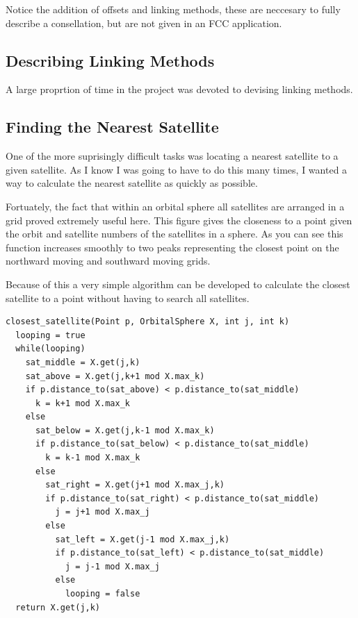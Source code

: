 \documentclass[12pt]{article}
\begin{document}
Notice the addition of offsets and linking methods, these are neccesary to fully describe a consellation, but are not given in an FCC application.

\subsection{Describing Linking Methods}

A large proprtion of time in the project was devoted to devising linking methods.


\subsection{Finding the Nearest Satellite}

One of the more suprisingly difficult tasks was locating a nearest satellite to a given satellite. As I know I was going to have to do this many times, I wanted a way to calculate the nearest satellite as quickly as possible.

Fortuately, the fact that within an orbital sphere all satellites are arranged in a grid proved extremely useful here. This figure gives the closeness to a point given the orbit and satellite numbers of the satellites in a sphere. As you can see this function increases smoothly to two peaks representing the closest point on the northward moving and southward moving grids.


Because of this a very simple algorithm can be developed to calculate the closest satellite to a point without having to search all satellites.

\begin{lstlisting}
closest_satellite(Point p, OrbitalSphere X, int j, int k)
  looping = true
  while(looping)
    sat_middle = X.get(j,k)
    sat_above = X.get(j,k+1 mod X.max_k)
    if p.distance_to(sat_above) < p.distance_to(sat_middle)
      k = k+1 mod X.max_k
    else 
      sat_below = X.get(j,k-1 mod X.max_k)
      if p.distance_to(sat_below) < p.distance_to(sat_middle)
        k = k-1 mod X.max_k
      else
        sat_right = X.get(j+1 mod X.max_j,k)
        if p.distance_to(sat_right) < p.distance_to(sat_middle)
          j = j+1 mod X.max_j
        else
          sat_left = X.get(j-1 mod X.max_j,k)
          if p.distance_to(sat_left) < p.distance_to(sat_middle)
            j = j-1 mod X.max_j
          else
            looping = false
  return X.get(j,k)
\end{lstlisting}
\end{document}
